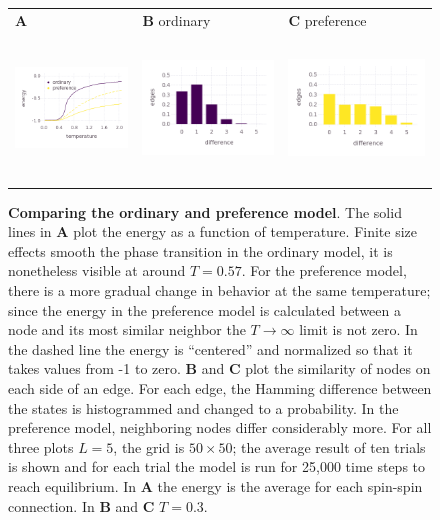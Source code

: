 \documentclass[letterpaper]{article}
\begin{document}
\begin{figure}[ht]
\begin{center}
\begin{tabular}{lll}
\textbf{A}&\textbf{B} ordinary&\textbf{C} preference\\
\includegraphics[height=1.5in]{energy.png}&\includegraphics[height=1.5in]{ord_hist.png}&\includegraphics[height=1.5in]{evo_hist.png}
\end{tabular}
\caption{\textbf{Comparing the ordinary and preference model}. The solid lines in \textbf{A} plot the energy as a function of temperature. Finite size effects smooth the phase transition in the ordinary model, it is nonetheless visible at around $T=0.57$. For the preference model, there is a more gradual change in behavior at the same temperature; since the energy in the preference model is calculated between a node and its most similar neighbor the $T\rightarrow \infty$ limit is not zero. In the dashed line the energy is ``centered'' and normalized so that it takes values from -1 to zero. \textbf{B} and \textbf{C} plot the similarity of nodes on each side of an edge. For each edge, the Hamming difference between the states is histogrammed and changed to a probability. In the preference model, neighboring nodes differ considerably more. For all three plots $L=5$, the grid is $50\times 50$; the average result of ten trials is shown and for each trial the model is run for 25,000 time steps to reach equilibrium. In \textbf{A} the energy is the average for each spin-spin connection. In \textbf{B} and \textbf{C} $T=0.3$.}
\label{figure}
\end{center}
\end{figure}
\end{document}
